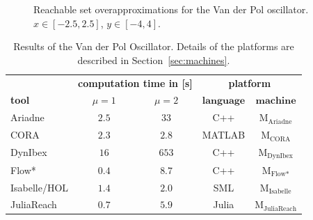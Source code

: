 \documentclass[EPiC]{easychair}
\begin{document}
\begin{figure}[p]
{   \label{fig:vanderpol:flowstar}}
  \hspace{0.2in}
\caption{Reachable set overapproximations for the Van der Pol oscillator. $x \in [-2.5, 2.5]$, $y \in [-4, 4]$.}
\label{fig:vanderpol}
\end{figure}

\begin{table}[t]
	\setlength{\tabcolsep}{4pt}
	\renewcommand{\arraystretch}{1.2}
	\centering
	\caption{Results of the Van der Pol Oscillator. Details of the platforms are described in Section~\ref{sec:machines}.}\label{tab:compTimes:vanderpol}
	\begin{tabular}[c]{lcccc}
	\hline
		   & \multicolumn{2}{c}{\textbf{computation time in [s]}} &  \multicolumn{2}{c}{\textbf{platform}} \\
        \cmidrule(l){2-3}
		 \textbf{tool} & \textbf{$\mu=1$} & \textbf{$\mu = 2$} & $\textbf{language}$ & $\textbf{machine}$ \\		 
		 \hline
		 Ariadne & $2.5$ & $33$ & C++ & M$_{\text{Ariadne}}$ \\
         CORA & $2.3$ & $2.8$ & MATLAB & M$_{\text{CORA}}$ \\
         DynIbex & $16$ & $653$ & C++ &  M$_{\text{DynIbex}}$\\
         Flow* & $0.4$ & $8.7$ & C++ & M$_{\text{Flow*}}$ \\
         Isabelle/HOL & $1.4$ & $2.0$ & SML & M$_{\text{Isabelle}}$ \\
         JuliaReach & $0.7$ & $5.9$ & Julia & M$_{\text{JuliaReach}}$ \\
		 \hline
	\end{tabular}
\end{table}
\end{document}

